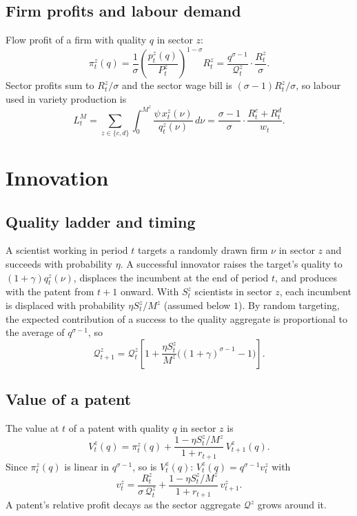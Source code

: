 \documentclass[12pt]{article}
\begin{document}
\subsection{Firm profits and labour demand}

Flow profit of a firm with quality $q$ in sector $z$:
\[
\pi^z_t(q) = \frac{1}{\sigma}
\left(\frac{p^z_t(q)}{P^z_t}\right)^{1-\sigma}R^z_t
=\frac{q^{\sigma-1}}{\mathcal Q^z_t}\cdot\frac{R^z_t}{\sigma} .
\]
Sector profits sum to $R^z_t/\sigma$ and the sector wage bill is
$(\sigma-1)R^z_t/\sigma$, so labour used in variety production is
\[
L^M_t=\sum_{z\in\{c,d\}}\int_0^{M^z}\frac{\psi\,x^z_t(\nu)}{q^z_t(\nu)}\,d\nu
=\frac{\sigma-1}{\sigma}\cdot\frac{R^c_t+R^d_t}{w_t} .
\]

\section{Innovation}\label{sec:innovation}

\subsection{Quality ladder and timing}

A scientist working in period $t$ targets a randomly drawn firm $\nu$ in
sector $z$ and succeeds with probability $\eta$. A successful innovator
raises the target's quality to $(1+\gamma)q^z_t(\nu)$, displaces the
incumbent at the end of period $t$, and produces with the patent from
$t+1$ onward. With $S^z_t$ scientists in sector $z$, each incumbent is
displaced with probability $\eta S^z_t/M^z$ (assumed below $1$). By
random targeting, the expected contribution of a success to the quality
aggregate is proportional to the average of $q^{\sigma-1}$, so
\[
\mathcal Q^z_{t+1}=\mathcal Q^z_t\left[1+\frac{\eta S^z_t}{M^z}
\Big((1+\gamma)^{\sigma-1}-1\Big)\right] .
\]

\subsection{Value of a patent}

The value at $t$ of a patent with quality $q$ in sector $z$ is
\[
V^z_t(q)=\pi^z_t(q)+\frac{1-\eta S^z_t/M^z}{1+r_{t+1}}\,V^z_{t+1}(q) .
\]
Since $\pi^z_t(q)$ is linear in $q^{\sigma-1}$, so is $V^z_t(q)$:
$V^z_t(q)=q^{\sigma-1}v^z_t$ with
\[
v^z_t=\frac{R^z_t}{\sigma\,\mathcal Q^z_t}
+\frac{1-\eta S^z_t/M^z}{1+r_{t+1}}\,v^z_{t+1} .
\]
A patent's relative profit decays as the sector aggregate
$\mathcal Q^z$ grows around it.
\end{document}
